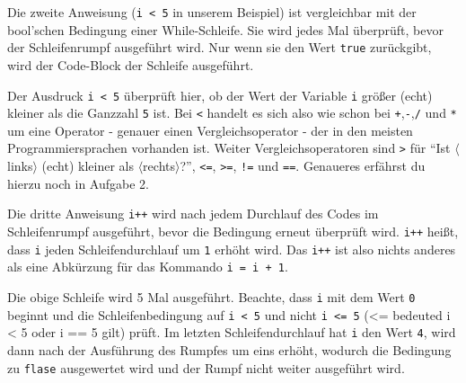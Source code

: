 \begin{Infobox}
Die zweite Anweisung (\lstinline{i < 5} in unserem Beispiel) ist vergleichbar mit der bool'schen Bedingung einer While-Schleife.
Sie wird jedes Mal überprüft, bevor der Schleifenrumpf ausgeführt wird.
Nur wenn sie den Wert \lstinline{true} zurückgibt, wird der Code-Block der Schleife ausgeführt.\newline

Der Ausdruck \lstinline{i < 5} überprüft hier, ob der Wert der Variable \texttt{i} größer (echt) kleiner als die Ganzzahl \texttt{5} ist.
Bei \texttt{<} handelt es sich also wie schon bei \texttt{+},\texttt{-},\texttt{/} und \texttt{*} um eine Operator - genauer einen Vergleichsoperator - der in den meisten Programmiersprachen vorhanden ist.
Weiter Vergleichsoperatoren sind \texttt{>} für \enquote{Ist $\langle$links$\rangle$ (echt) kleiner als $\langle$rechts$\rangle$?}, \texttt{<=}, \texttt{>=}, \texttt{!=} und \texttt{==}.
Genaueres erfährst du hierzu noch in Aufgabe 2.\newline

Die dritte Anweisung \lstinline{i++} wird nach jedem Durchlauf des Codes im Schleifenrumpf ausgeführt, bevor die Bedingung erneut überprüft wird.
\lstinline{i++} heißt, dass \lstinline{i} jeden Schleifendurchlauf um \lstinline{1} erhöht wird.
Das \lstinline{i++} ist also nichts anderes als eine Abkürzung für das Kommando \lstinline{i = i + 1}.\newline

Die obige Schleife wird 5 Mal ausgeführt.
Beachte, dass \lstinline{i} mit dem Wert \lstinline{0} beginnt und die Schleifenbedingung auf \lstinline{i < 5} und nicht \lstinline{i <= 5} (<= bedeuted i < 5 oder i == 5 gilt) prüft.
Im letzten Schleifendurchlauf hat \lstinline{i} den Wert \lstinline{4}, wird dann nach der Ausführung des Rumpfes um eins erhöht, wodurch die Bedingung zu \lstinline{flase} ausgewertet wird und der Rumpf nicht weiter ausgeführt wird.
\end{Infobox}


